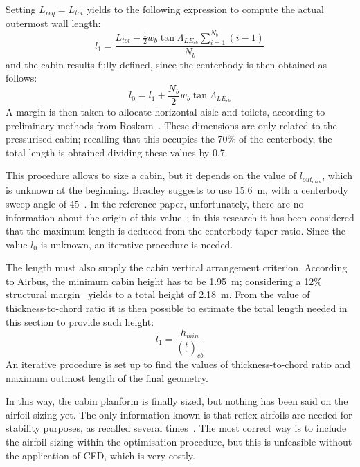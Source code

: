 Setting $L_{req}=L_{tot}$ yields to the following expression to compute the actual outermost wall length:
\begin{equation}
\label{eq:outermost_wall_length}
l_1 = \frac{L_{tot}-\frac{1}{2}w_b\tan\Lambda_{LE_{cb}}\sum_{i=1}^{N_b}\left(i-1\right)}{N_b}
\end{equation}
and the cabin results fully defined, since the centerbody is then obtained as follows:
\begin{equation}
\label{eq:center_section_length}
l_0 = l_1 + \frac{N_b}{2}w_b\tan\Lambda_{LE_{cb}}
\end{equation}
A margin is then taken to allocate horizontal aisle and toilets, according to preliminary methods from Roskam~\cite{bib:roskam_partIII}. 
These dimensions are only related to the pressurised cabin; recalling that this occupies the 70\% of the centerbody, the total length is obtained dividing these values by 0.7.

This procedure allows to size a cabin, but it depends on the value of $l_{out_{\max}}$, which is unknown at the beginning. 
Bradley suggests to use 15.6~\si{\meter}, with a centerbody sweep angle of 45~\si{\deg}. 
In the reference paper, unfortunately, there are no information about the origin of this value~\cite{bib:bradley_bwb}; in this research it has been considered that the maximum length is deduced from the centerbody taper ratio. 
Since the value $l_0$ is unknown, an iterative procedure is needed. 

The length must also supply the cabin vertical arrangement criterion. 
According to Airbus, the minimum cabin height has to be 1.95~\si{\meter}; considering a 12\% structural margin~\cite{bib:raymer, bib:roskam_partIII} yields to a total height of 2.18~\si{\meter}.
From the value of thickness-to-chord ratio it is then possible to estimate the total length needed in this section to provide such height:
\begin{equation}
\label{eq:outermost_section_length}
l_1 = \frac{h_{min}}{\left(\frac{t}{c}\right)_{cb}}
\end{equation}
An iterative procedure is set up to find the values of thickness-to-chord ratio and maximum outmost length of the final geometry. 

In this way, the cabin planform is finally sized, but nothing has been said on the airfoil sizing yet. 
The only information known is that reflex airfoils are needed for stability purposes, as recalled several times~\cite{bib:alex, bib:nickel}.
The most correct way is to include the airfoil sizing within the optimisation procedure, but this is unfeasible without the application of CFD, which is very costly. 

